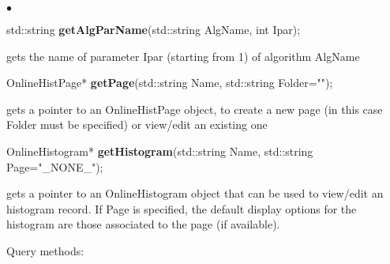\documentclass{lhcbnote}
\begin{document}
\begin{list}{$\bullet$}{}
\item std::string {\bf getAlgParName}(std::string AlgName,
		       int Ipar);

gets the name of parameter Ipar (starting from 1) of algorithm AlgName

\item  OnlineHistPage* {\bf getPage}(std::string Name, std::string Folder="");

gets a pointer to an OnlineHistPage object, to create a new page (in this case
Folder must be specified) or view/edit an existing one


\item  OnlineHistogram* {\bf getHistogram}(std::string Name,
				std::string Page="\_NONE\_");

gets a pointer to an OnlineHistogram object
that can be used to view/edit an histogram record. If Page
is specified, the default display options for the histogram are those
associated to the page (if available). 
\end{list}


Query methods:
\end{document}
